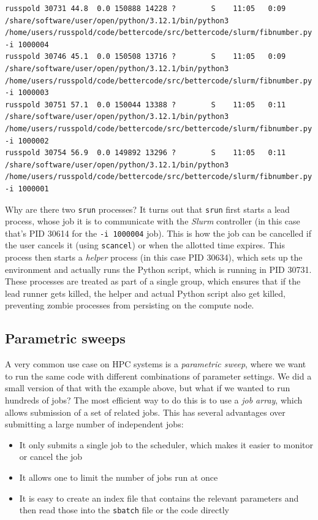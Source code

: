 \begin{lstlisting}[style=shell]
russpold 30731 44.8  0.0 150888 14228 ?        S    11:05   0:09 /share/software/user/open/python/3.12.1/bin/python3 /home/users/russpold/code/bettercode/src/bettercode/slurm/fibnumber.py -i 1000004
russpold 30746 45.1  0.0 150508 13716 ?        S    11:05   0:09 /share/software/user/open/python/3.12.1/bin/python3 /home/users/russpold/code/bettercode/src/bettercode/slurm/fibnumber.py -i 1000003
russpold 30751 57.1  0.0 150044 13388 ?        S    11:05   0:11 /share/software/user/open/python/3.12.1/bin/python3 /home/users/russpold/code/bettercode/src/bettercode/slurm/fibnumber.py -i 1000002
russpold 30754 56.9  0.0 149892 13296 ?        S    11:05   0:11 /share/software/user/open/python/3.12.1/bin/python3 /home/users/russpold/code/bettercode/src/bettercode/slurm/fibnumber.py -i 1000001
\end{lstlisting}

Why are there two \texttt{srun} processes?  It turns out that \texttt{srun} first starts a lead process, whose job it is to communicate with the \textit{Slurm} controller (in this case that's PID 30614 for the \texttt{-i 1000004} job).  This is how the job can be cancelled if the user cancels it (using \texttt{scancel}) or when the allotted time expires.  This process then starts a \textit{helper} process (in this case PID 30634), which sets up the environment and actually runs the Python script, which is running in PID 30731. These processes are treated as part of a single group, which ensures that if the lead runner gets killed, the helper and actual Python script also get killed, preventing zombie processes from persisting on the compute node.

\subsection{Parametric sweeps}

A very common use case on HPC systems is a \textit{parametric sweep}, where we want to run the same code with different combinations of parameter settings.  We did a small version of that with the example above, but what if we wanted to run hundreds of jobs?  The most efficient way to do this is to use a \textit{job array}, which allows submission of a set of related jobs. This has several advantages over submitting a large number of independent jobs:

\begin{itemize}
\item It only submits a single job to the scheduler, which makes it easier to monitor or cancel the job
\item It allows one to limit the number of jobs run at once
\item It is easy to create an index file that contains the relevant parameters and then read those into the \texttt{sbatch} file or the code directly
\end{itemize}

